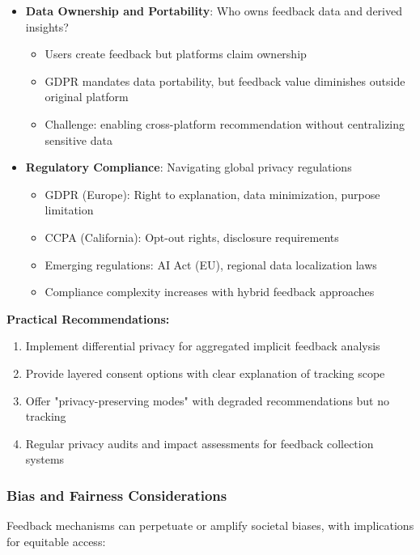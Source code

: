 \begin{itemize}
    \item \textbf{Data Ownership and Portability}: Who owns feedback data and derived insights?
    \begin{itemize}
        \item Users create feedback but platforms claim ownership
        \item GDPR mandates data portability, but feedback value diminishes outside original platform
        \item Challenge: enabling cross-platform recommendation without centralizing sensitive data
    \end{itemize}
    
    \item \textbf{Regulatory Compliance}: Navigating global privacy regulations
    \begin{itemize}
        \item GDPR (Europe): Right to explanation, data minimization, purpose limitation
        \item CCPA (California): Opt-out rights, disclosure requirements
        \item Emerging regulations: AI Act (EU), regional data localization laws
        \item Compliance complexity increases with hybrid feedback approaches
    \end{itemize}
\end{itemize}

\textbf{Practical Recommendations:}
\begin{enumerate}
    \item Implement differential privacy for aggregated implicit feedback analysis
    \item Provide layered consent options with clear explanation of tracking scope
    \item Offer "privacy-preserving modes" with degraded recommendations but no tracking
    \item Regular privacy audits and impact assessments for feedback collection systems
\end{enumerate}

\subsubsection{Bias and Fairness Considerations}

Feedback mechanisms can perpetuate or amplify societal biases, with implications for equitable access:

